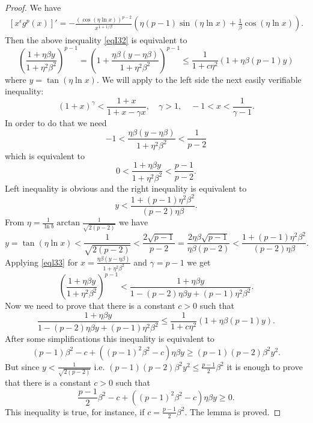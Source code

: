 \documentclass{amsart}
\theoremstyle{definition}
\theoremstyle{remark}
\numberwithin{equation}{section}
\begin{document}
	\begin{proof}
We have
\begin{align*}
\left[x^\epsilon g^p(x) \right]'=-\frac{(\cos(\eta\ln x))^{p-2}}{x^{1+1/\beta}}
\left(\eta (p-1)\sin(\eta\ln x)+\frac{1}{\beta}\cos(\eta\ln x) \right).
\end{align*}
Then the above inequality \eqref{eqI32} is equivalent to
\[
\left(\frac{1+\eta \beta y}{1+\eta^2\beta^2} \right)^{p-1}
=\left(1+\frac{\eta \beta (y-\eta \beta )}{1+\eta^2\beta^2} \right)^{p-1}
\le\frac{1}{1+c\eta^2}\left( 1+\eta\beta (p-1)y\right)
\]
where $y=\tan(\eta\ln x)$. We will apply to the left side the next easily verifiable inequality:
\begin{equation}\label{eql33}
(1+x)^\gamma<\frac{1+x}{1+x-\gamma x}, \quad \gamma>1, \quad -1<x<\frac{1}{\gamma-1}.
\end{equation}
In order to do that we need
\[
-1<\frac{\eta \beta (y-\eta \beta )}{1+\eta^2\beta^2}<\frac{1}{p-2}
\]
which is equivalent to
\[
0<\frac{1+\eta \beta y}{1+\eta^2\beta^2}<\frac{p-1}{p-2}.
\]
Left inequality is obvious and the right inequality is equivalent to
\[
y<\frac{1+(p-1)\eta^2 \beta^2}{(p-2)\eta\beta}.
\]
From $\eta=\frac{1}{\ln b}\arctan{\frac{1}{\sqrt{2(p-2)}}}$ we have 
\[
y=\tan(\eta\ln x)<\frac{1}{\sqrt{2(p-2)}}<\frac{2\sqrt{p-1}}{p-2}
=\frac{2\eta \beta \sqrt{p-1}}{\eta\beta(p-2)}<\frac{1+(p-1)\eta^2 \beta^2}{(p-2)\eta\beta}.
\]
Applying \eqref{eql33} for $x=\frac{\eta \beta (y-\eta \beta )}{1+\eta^2\beta^2}$ and $\gamma=p-1$ we get
\[
\left(\frac{1+\eta \beta y}{1+\eta^2\beta^2} \right)^{p-1}
<\frac{1+\eta \beta y}{1-(p-2)\eta \beta y+(p-1)\eta^2\beta^2}.
\]
Now we need to prove that there is a constant $c>0$ such that
\[
\frac{1+\eta \beta y}{1-(p-2)\eta \beta y+(p-1)\eta^2\beta^2}
\le\frac{1}{1+c\eta^2}\left( 1+\eta\beta (p-1)y\right).
\]
After some simplifications this inequality is equivalent to
\[
(p-1)\beta^2-c +\left((p-1)^2\beta^2-c \right)\eta\beta y
\geq (p-1)(p-2)\beta^2y^2.
\]
But since $y<\frac{1}{\sqrt{2(p-2)}}$ i.e. $(p-1)(p-2)\beta^2y^2\le \frac{p-1}{2}\beta^2$ it is enough  to prove that there is a constant $c>0$ such that
\[
\frac{p-1}{2}\beta^2-c +\left((p-1)^2\beta^2-c \right)\eta\beta y\geq 0.
\]
This inequality is true, for instance, if $c= \frac{p-1}{2}\beta^2$. The lemma is proved.

\end{proof}



\end{document}
